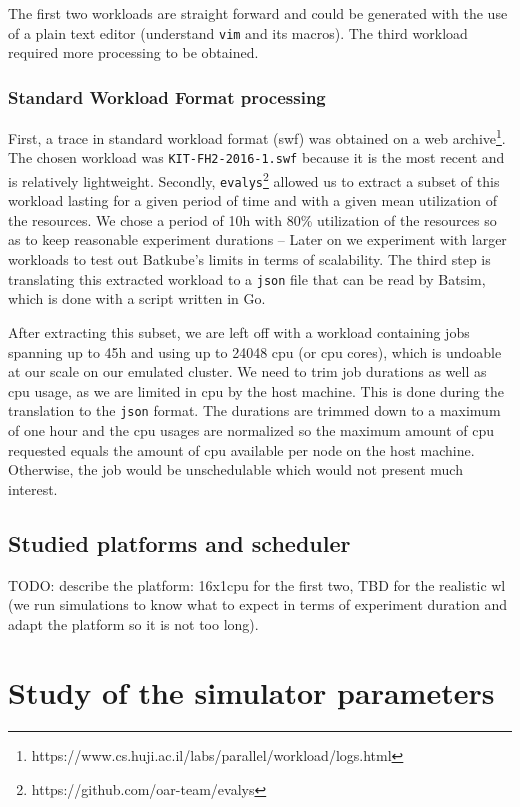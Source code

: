 \documentclass[12pt, a4paper]{memoir}
\begin{document}
The first two workloads are straight forward and could be generated with the
use of a plain text editor (understand \texttt{vim} and its macros). The third
workload required more processing to be obtained.  

\subsubsection{Standard Workload Format processing}

First, a trace in standard
workload format (swf) was obtained on a web
archive\footnote{https://www.cs.huji.ac.il/labs/parallel/workload/logs.html}.
The chosen workload was \texttt{KIT-FH2-2016-1.swf} because it is the most
recent and is relatively lightweight. Secondly,
\texttt{evalys}\footnote{https://github.com/oar-team/evalys} allowed us to
extract a subset of this workload lasting for a given period of time and with a
given mean utilization of the resources. We chose a period of 10h with 80\%
utilization of the resources so as to keep reasonable experiment durations --
Later on we experiment with larger workloads to test out Batkube's limits in
terms of scalability.  The third step is translating this extracted workload to
a \texttt{json} file that can be read by Batsim, which is done with a script
written in Go.

After extracting this subset, we are left off with a workload containing jobs
spanning up to 45h and using up to 24048 cpu (or cpu cores), which is undoable
at our scale on our emulated cluster. We need to trim job durations as well as
cpu usage, as we are limited in cpu by the host machine. This is done during
the translation to the \texttt{json} format. The durations are trimmed down to
a maximum of one hour and the cpu usages are normalized so the maximum amount
of cpu requested equals the amount of cpu available per node on the host
machine. Otherwise, the job would be unschedulable which would not present much
interest.

\subsection{Studied platforms and scheduler}

TODO: describe the platform: 16x1cpu for the first two, TBD for the realistic
wl (we run simulations to know what to expect in terms of experiment duration
and adapt the platform so it is not too long).\\


\section{Study of the simulator parameters}
\end{document}
